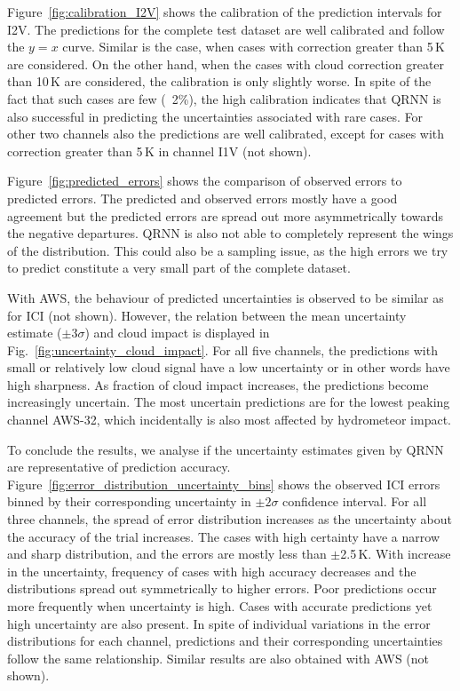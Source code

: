 \documentclass[amt, manuscript]{copernicus}
\begin{document}
Figure~\ref{fig:calibration_I2V} shows the calibration of the prediction intervals for I2V. The predictions for the complete test dataset are well calibrated and follow the $y =x$ curve. Similar is the case, when cases with correction greater than 5\,K are considered. On the other hand, when  the cases with cloud correction greater than 10\,K are considered, the calibration is only slightly worse. In spite of the fact that such cases are few (~2\%), the high calibration indicates that QRNN is also successful in predicting the uncertainties associated with rare cases. For other two channels also the predictions are well calibrated, except for cases with correction greater than 5\,K in channel I1V (not shown). 

Figure~\ref{fig:predicted_errors} shows the comparison of observed errors to predicted errors. The predicted and observed errors mostly have a good agreement but the predicted errors are spread out more asymmetrically towards the negative departures. QRNN is also not able to completely represent the wings of the distribution. This could also be a sampling issue, as the high errors we try to predict constitute a very small part of the complete dataset. 

With AWS, the behaviour of predicted uncertainties is observed to be similar as for ICI (not shown). However, the relation between the mean uncertainty estimate ($\pm3\sigma$) and cloud impact is displayed in Fig.~\ref{fig:uncertainty_cloud_impact}. For all five channels, the predictions with small or relatively low cloud signal have a low uncertainty or in other words have high sharpness. As fraction of cloud impact increases, the predictions become increasingly uncertain. The most uncertain predictions are for the lowest peaking channel AWS-32, which incidentally is also most affected by  hydrometeor impact.  

To conclude the results, we analyse if the uncertainty estimates given by QRNN are representative of prediction accuracy. Figure~\ref{fig:error_distribution_uncertainty_bins} shows the observed ICI errors binned by their corresponding uncertainty in $\pm2\sigma$  confidence interval. For all three channels, the spread of error distribution increases as the uncertainty about the accuracy of the trial increases. The cases with high certainty have a narrow and sharp distribution, and the errors are mostly less than $\pm$2.5\,K. With increase in the uncertainty, frequency of cases with high accuracy decreases and the distributions spread out symmetrically to higher errors. Poor predictions occur more frequently when uncertainty is high. Cases with accurate predictions yet high uncertainty are also present. In spite of individual variations in the error distributions for each channel, predictions and their corresponding uncertainties follow the same relationship. Similar results are also obtained with AWS (not shown). 
\end{document}
